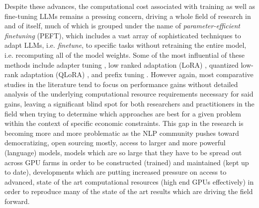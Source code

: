 \documentclass[final]{clv2025}
\begin{document}
Despite these advances, the computational cost associated with training as well as fine-tuning LLMs remains a pressing concern, driving a whole field of research in and of itself, much of which is grouped under the name of \textit{parameter-efficient finetuning} (PEFT), which includes a vast array of sophisticated techniques to adapt LLMs, i.e. \textit{finetune}, to specific tasks without retraining the entire model, i.e. recomputing all of the model weights. Some of the most influential of these methods include adapter tuning \cite{pmlr-v97-houlsby19a}, low ranked adaptation (LoRA) \cite{hu2021loralowrankadaptationlarge}, quantized low-rank adaptation (QLoRA) \cite{dettmers2023qloraefficientfinetuningquantized}, and prefix tuning \cite{li2021prefixtuningoptimizingcontinuousprompts}. However again, most comparative studies in the literature tend to focus on performance gains without detailed analysis of the underlying computational resource requirements necessary for said gains, leaving a significant blind spot for both researchers and practitioners in the field when trying to determine which approaches are best for a given problem within the context of specific economic constraints. This gap in the research is becoming more and more problematic as the NLP community pushes toward democratizing, open sourcing mostly, access to larger and more powerful (language) models, models which are so large that they have to be spread out across GPU farms in order to be constructed (trained) and maintained (kept up to date), developments which are putting increased pressure on access to advanced, state of the art computational resources (high end GPUs effectively) in order to reproduce many of the state of the art results which are driving the field forward.
\end{document}
